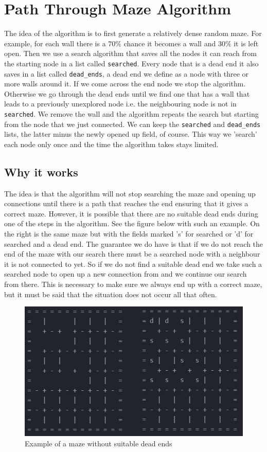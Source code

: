 \documentclass[10pt, a4paper, twoside]{amsart}
\newcommand{\1}{\mathbbm{1}}
\begin{document}
\section{Path Through Maze Algorithm}
The idea of the algorithm is to first generate a relatively dense random maze. For example, for each wall there is a $70\%$ chance it becomes a wall and $30\%$ it is left open. Then we use a search algorithm that saves all the nodes it can reach from the starting node in a list called \verb+searched+. Every node that is a dead end it also saves in a list called \verb+dead_ends+, a dead end we define as a node with three or more walls around it. If we come across the end node we stop the algorithm. Otherwise we go through the dead ends until we find one that has a wall that leads to a previously unexplored node i.e. the neighbouring node is not in \verb+searched+. We remove the wall and the algorithm repeats the search but starting from the node that we just connected. We can keep the \verb+searched+ and \verb+dead_ends+ lists, the latter minus the newly opened up field, of course. This way we 'search' each node only once and the time the algorithm takes stays limited.

\subsection{Why it works}
The idea is that the algorithm will not stop searching the maze and opening up connections until there is a path that reaches the end ensuring that it gives a correct maze. However, it is possible that there are no suitable dead ends during one of the steps in the algorithm. See the figure below with such an example. On the right is the same maze but with the fields marked 's' for searched or 'd' for searched and a dead end. The guarantee we do have is that if we do not reach the end of the maze with our search there must be a searched node with a neighbour it is not connected to yet. So if we do not find a suitable dead end we take such a searched node to open up a new connection from and we continue our search from there. This is necessary to make sure we always end up with a correct maze, but it must be said that the situation does not occur all that often.

\begin{figure}
\centering
        \includegraphics[totalheight=8cm]{nodeadends}
    \caption{Example of a maze without suitable dead ends}
\end{figure}
\end{document}
